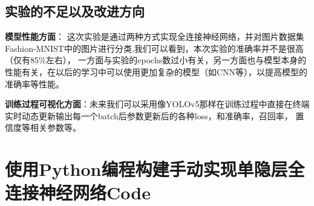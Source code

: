 \documentclass[12pt]{article}
\begin{document}
\subsection{实验的不足以及改进方向}
\textbf{模型性能方面}：
这次实验是通过两种方式实现全连接神经网络，并对图片数据集Fashion-MNIST中的图片进行分类,我们可以看到，本次实验的准确率并不是很高（仅有85\%左右），
一方面与实验的epochs数过小有关，另一方面也与模型本身的性能有关，在以后的学习中可以使用更加复杂的模型（如CNN等），以提高模型的准确率等性能。

\textbf{训练过程可视化方面}：未来我们可以采用像YOLOv5那样在训练过程中直接在终端实时动态更新输出每一个batch后参数更新后的各种loss，和准确率，召回率，
置信度等相关参数等。

\newpage
\appendix
\section{使用Python编程构建手动实现单隐层全连接神经网络Code}
\end{document}
